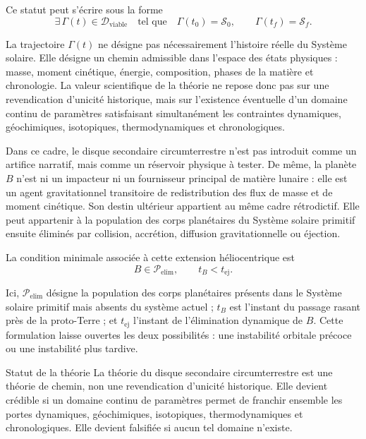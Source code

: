 \documentclass[11pt,a4paper,openany]{report}
\begin{document}
Ce statut peut s'écrire sous la forme
\begin{equation}
\boxed{
\exists\,\Gamma(t)\in\mathcal{D}_{\mathrm{viable}}
\quad\text{tel que}\quad
\Gamma(t_0)=\mathcal{S}_0,\qquad
\Gamma(t_f)=\mathcal{S}_f .
}
\label{eq:statut-retrodictif}
\end{equation}

La trajectoire $\Gamma(t)$ ne désigne pas nécessairement l'histoire réelle du
Système solaire. Elle désigne un chemin admissible dans l'espace des états
physiques : masse, moment cinétique, énergie, composition, phases de la matière
et chronologie. La valeur scientifique de la théorie ne repose donc pas sur une
revendication d'unicité historique, mais sur l'existence éventuelle d'un domaine
continu de paramètres satisfaisant simultanément les contraintes dynamiques,
géochimiques, isotopiques, thermodynamiques et chronologiques.

Dans ce cadre, le disque secondaire circumterrestre n'est pas introduit comme
un artifice narratif, mais comme un réservoir physique à tester. De même, la
planète $B$ n'est ni un impacteur ni un fournisseur principal de matière
lunaire : elle est un agent gravitationnel transitoire de redistribution des
flux de masse et de moment cinétique. Son destin ultérieur appartient au même
cadre rétrodictif. Elle peut appartenir à la population des corps planétaires du
Système solaire primitif ensuite éliminés par collision, accrétion, diffusion
gravitationnelle ou éjection.

La condition minimale associée à cette extension héliocentrique est
\begin{equation}
\boxed{
B\in\mathcal{P}_{\mathrm{elim}},
\qquad
 t_B<t_{\mathrm{ej}} .
}
\label{eq:B-elim-preambule}
\end{equation}

Ici, $\mathcal{P}_{\mathrm{elim}}$ désigne la population des corps planétaires
présents dans le Système solaire primitif mais absents du système actuel ;
$t_B$ est l'instant du passage rasant près de la proto-Terre ; et
$t_{\mathrm{ej}}$ l'instant de l'élimination dynamique de $B$. Cette formulation
laisse ouvertes les deux possibilités : une instabilité orbitale précoce ou une
instabilité plus tardive.

\begin{principe}{Statut de la théorie}
La théorie du disque secondaire circumterrestre est une théorie de chemin, non
une revendication d'unicité historique. Elle devient crédible si un domaine
continu de paramètres permet de franchir ensemble les portes dynamiques,
géochimiques, isotopiques, thermodynamiques et chronologiques. Elle devient
falsifiée si aucun tel domaine n'existe.
\end{principe}
\end{document}
